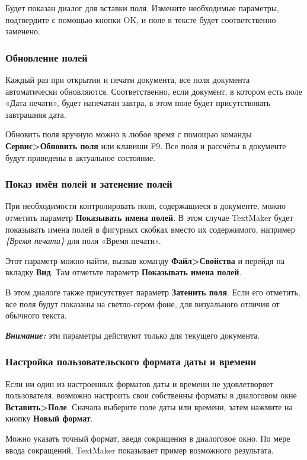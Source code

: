 \documentclass[a4paper,10pt]{article}
\begin{document}
Будет показан диалог для вставки поля. Измените необходимые параметры, подтвердите с помощью кнопки OK, и поле в тексте будет соответственно заменено.

\subsubsection{Обновление полей}

Каждый раз при открытии и печати документа, все поля документа автоматически обновляются. Соответственно, если документ, в котором есть поле «Дата печати», будет напечатан завтра, в этом поле будет присутствовать завтрашняя дата.

Обновить поля вручную можно в любое время с помощью команды \textbf{Сервис>Обновить поля} или клавиши F9. Все поля и рассчёты в документе будут приведены в актуальное состояние.

\subsubsection{Показ имён полей и затенение полей}
При необходимости контролировать поля, содержащиеся в документе, можно отметить параметр \textbf{Показывать имена полей}. В этом случае TextMaker будет показывать имена полей в фигурных скобках вместо их содержимого, например \textit{\{Время печати\}} для поля «Время печати».

Этот параметр можно найти, вызвав команду \textbf{Файл>Свойства} и перейдя на вкладку \textbf{Вид}. Там отметьте параметр \textbf{Показывать имена полей}.

В этом диалоге также присутствует параметр \textbf{Затенить поля}. Если его отметить, все поля будут показаны на светло-сером фоне, для визуального отличия от обычного текста.

\textit{\textbf{Внимание:}} эти параметры действуют только для текущего документа.

\subsubsection{Настройка пользовательского формата даты и времени}
Если ни один из настроенных форматов даты и времени не удовлетворяет пользователя, возможно настроить свои собственны форматы в диалоговом окне \textbf{Вставить>Поле}. Сначала выберите поле даты или времени, затем нажмите на кнопку \textbf{Новый формат}.

Можно указать точный формат, введя сокращения в диалоговое окно. По мере ввода сокращений, TextMaker показывает пример возможного результата.
\end{document}
